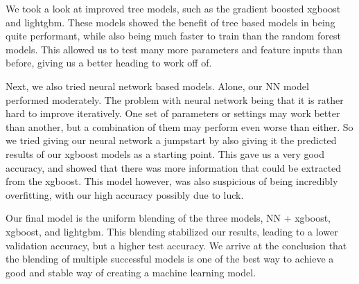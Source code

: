 \documentclass[a4paper, 12pt]{article}
\begin{document}
                We took a look at improved tree models, such as the gradient boosted xgboost and lightgbm. These models showed the benefit of tree based models in being quite performant, while also being much faster to train than the random forest models. This allowed us to test many more parameters and feature inputs than before, giving us a better heading to work off of.

                Next, we also tried neural network based models. Alone, our NN model performed moderately. The problem with neural network being that it is rather hard to improve iteratively. One set of parameters or settings may work better than another, but a combination of them may perform even worse than either. So we tried giving our neural network a jumpstart by also giving it the predicted results of our xgboost models as a starting point. This gave us a very good accuracy, and showed that there was more information that could be extracted from the xgboost. This model however, was also suspicious of being incredibly overfitting, with our high accuracy possibly due to luck.

                Our final model is the uniform blending of the three models, NN + xgboost, xgboost, and lightgbm. This blending stabilized our results, leading to a lower validation accuracy, but a higher test accuracy.  We arrive at the conclusion that the blending of multiple successful models is one of the best way to achieve a good and stable way of creating a machine learning model.

\vskip 5cm
{}

\end{document}
